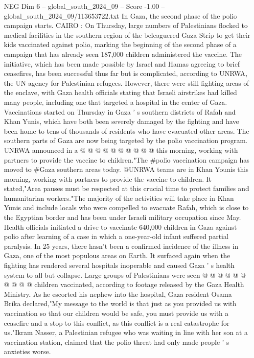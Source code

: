 \begin{textsample}{NEG Dim 6 – global\_south\_2024\_09 – Score -1.00 – global\_south\_2024\_09/113653722.txt}  \label{ex:f6_neg_033}
In Gaza, the second phase of the polio campaign starts.
CAIRO : On Thursday, large numbers of Palestinians flocked to medical facilities in the southern region of the beleaguered Gaza Strip to get their kids vaccinated against polio, marking the beginning of the second phase of a campaign that has already seen 187,000 children administered the vaccine.
The initiative, which has been made possible by Israel and Hamas agreeing to brief ceasefires, has been successful thus far but is complicated, according to UNRWA, the UN agency for Palestinian refugees.
However, there were still fighting areas of the enclave, with Gaza health officials stating that Israeli airstrikes had killed many people, including one that targeted a hospital in the center of Gaza.
Vaccinations started on Thursday in Gaza ' s southern districts of Rafah and Khan Yunis, which have both been severely damaged by the fighting and have been home to tens of thousands of residents who have evacuated other areas.
The southern parts of Gaza are now being targeted by the polio vaccination program.
UNRWA announced in a @ @ @ @ @ @ @ @ @ @ this morning, working with partners to provide the vaccine to children."The \#polio vaccination campaign has moved to \#Gaza southern areas today. @UNRWA teams are in Khan Younis this morning, working with partners to provide the vaccine to children.
It stated,"Area pauses must be respected at this crucial time to protect families and humanitarian workers."The majority of the activities will take place in Khan Yunis and include locals who were compelled to evacuate Rafah, which is close to the Egyptian border and has been under Israeli military occupation since May.
Health officials initiated a drive to vaccinate 640,000 children in Gaza against polio after learning of a case in which a one-year-old infant suffered partial paralysis.
In 25 years, there hasn't been a confirmed incidence of the illness in Gaza, one of the most populous areas on Earth.
It surfaced again when the fighting has rendered several hospitals inoperable and caused Gaza ' s health system to all but collapse.
Large groups of Palestinians were seen @ @ @ @ @ @ @ @ @ @ children vaccinated, according to footage released by the Gaza Health Ministry.
As he escorted his nephew into the hospital, Gaza resident Osama Brika declared,"My message to the world is that just as you provided us with vaccination so that our children would be safe, you must provide us with a ceasefire and a stop to this conflict, as this conflict is a real catastrophe for us."Ikram Nasser, a Palestinian refugee who was waiting in line with her son at a vaccination station, claimed that the polio threat had only made people ' s anxieties worse.

\end{textsample}
